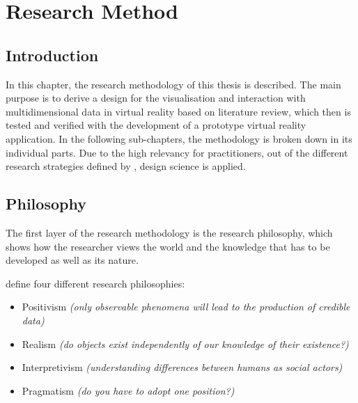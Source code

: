 
\chapter{Research Method} %

\label{Research Method} %


\section{Introduction}

In this chapter, the research methodology of this thesis is described. The main purpose is to derive a design for the visualisation and interaction with multidimensional data in virtual reality based on literature review, which then is tested and verified with the development of a prototype virtual reality application. In the following sub-chapters, the methodology is broken down in its individual parts. Due to the high relevancy for practitioners, out of the different research strategies defined by \cite{Hevner2010}, design science is applied.


\section{Philosophy}

The first layer of the research methodology is the research philosophy, which shows how the researcher views the world and the knowledge that has to be developed as well as its nature.

\cite{Saunders2009} define four different research philosophies:
\begin{itemize}[noitemsep,nolistsep]
	\item Positivism \textit{(only observable phenomena will lead to the production of credible data)}
	\item Realism \textit{(do objects exist independently of our knowledge of their existence?)}
	\item Interpretivism \textit{(understanding differences between humans as social actors)}
	\item Pragmatism \textit{(do you have to adopt one position?)}
\end{itemize}

